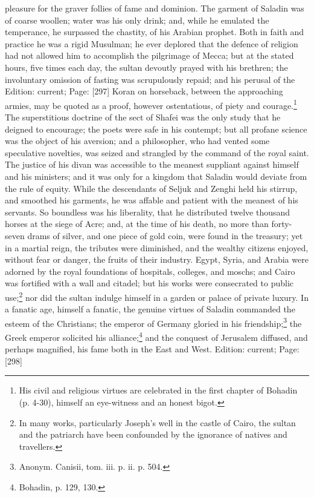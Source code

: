 pleasure for the graver follies of fame and dominion. The garment of Saladin was of coarse woollen; water was his only drink; and, while he emulated the temperance, he surpassed the chastity, of his Arabian prophet. Both in faith and practice he was a rigid Musulman; he ever deplored that the defence of religion had not allowed him to accomplish the pilgrimage of Mecca; but at the stated hours, five times each day, the sultan devoutly prayed with his brethren; the involuntary omission of fasting was scrupulously repaid; and his perusal of the Edition: current; Page: [297] Koran on horseback, between the approaching armies, may be quoted as a proof, however ostentatious, of piety and courage.\footnote{His civil and religious virtues are celebrated in the first chapter of Bohadin (p. 4-30), himself an eye-witness and an honest bigot.} The superstitious doctrine of the sect of Shafei was the only study that he deigned to encourage; the poets were safe in his contempt; but all profane science was the object of his aversion; and a philosopher, who had vented some speculative novelties, was seized and strangled by the command of the royal saint. The justice of his divan was accessible to the meanest suppliant against himself and his ministers; and it was only for a kingdom that Saladin would deviate from the rule of equity. While the descendants of Seljuk and Zenghi held his stirrup, and smoothed his garments, he was affable and patient with the meanest of his servants. So boundless was his liberality, that he distributed twelve thousand horses at the siege of Acre; and, at the time of his death, no more than forty-seven drams of silver, and one piece of gold coin, were found in the treasury; yet in a martial reign, the tributes were diminished, and the wealthy citizens enjoyed, without fear or danger, the fruits of their industry. Egypt, Syria, and Arabia were adorned by the royal foundations of hospitals, colleges, and moschs; and Cairo was fortified with a wall and citadel; but his works were consecrated to public use;\footnote{In many works, particularly Joseph\texthebrew{}’s well in the castle of Cairo, the sultan and the patriarch have been confounded by the ignorance of natives and travellers.} nor did the sultan indulge himself in a garden or palace of private luxury. In a fanatic age, himself a fanatic, the genuine virtues of Saladin commanded the esteem of the Christians; the emperor of Germany gloried in his friendship;\footnote{Anonym. Canisii, tom. iii. p. ii. p. 504.} the Greek emperor solicited his alliance;\footnote{Bohadin, p. 129, 130.} and the conquest of Jerusalem diffused, and perhaps magnified, his fame both in the East and West.
Edition: current; Page: [298]

